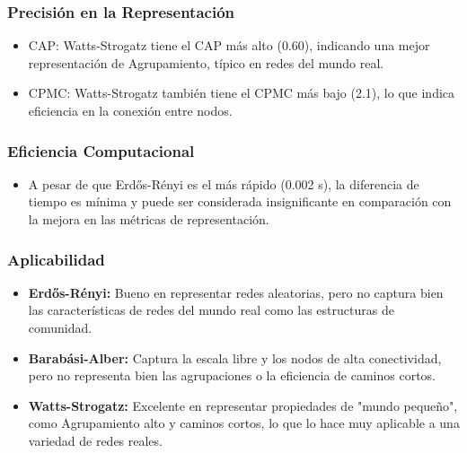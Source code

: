 \documentclass[12pt]{book}
\begin{document}
\subsubsection{Precisión en la Representación}
\begin{itemize}
    \item CAP: Watts-Strogatz tiene el CAP más alto (0.60), indicando una mejor representación de Agrupamiento, típico en redes del mundo real.
    \item CPMC: Watts-Strogatz también tiene el CPMC más bajo (2.1), lo que indica eficiencia en la conexión entre nodos.
\end{itemize}
\subsubsection{Eficiencia Computacional}

\begin{itemize}
    \item A pesar de que Erdős-Rényi es el más rápido (0.002 s), la diferencia de tiempo es mínima y puede ser considerada insignificante en comparación con la mejora en las métricas de representación.
\end{itemize}

\subsubsection{Aplicabilidad}

\begin{itemize}
    \item \textbf{Erdős-Rényi:} Bueno en representar redes aleatorias, pero no captura bien las características de redes del mundo real como las estructuras de comunidad.
    \item \textbf{Barabási-Alber:} Captura la escala libre y los nodos de alta conectividad, pero no representa bien las agrupaciones o la eficiencia de caminos cortos.
    \item \textbf{Watts-Strogatz:} Excelente en representar propiedades de "mundo pequeño", como Agrupamiento alto y caminos cortos, lo que lo hace muy aplicable a una variedad de redes reales.
\end{itemize}
\end{document}
